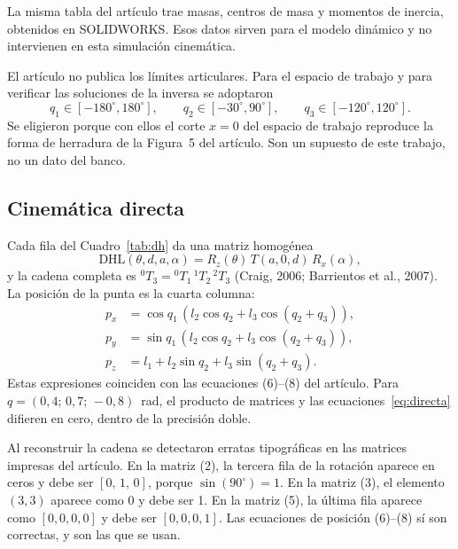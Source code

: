 \documentclass[11pt,a4paper]{article}
\newcommand{\DHL}{\ensuremath{\mathrm{DHL}}}
\begin{document}
La misma tabla del artículo trae masas, centros de masa y momentos de inercia, obtenidos en SOLIDWORKS. Esos datos sirven para el modelo dinámico y no intervienen en esta simulación cinemática.

El artículo no publica los límites articulares. Para el espacio de trabajo y para verificar las soluciones de la inversa se adoptaron
\begin{equation}
q_1\in[-180^\circ,180^\circ],\qquad q_2\in[-30^\circ,90^\circ],\qquad q_3\in[-120^\circ,120^\circ].
\end{equation}
Se eligieron porque con ellos el corte \(x=0\) del espacio de trabajo reproduce la forma de herradura de la Figura~5 del artículo. Son un supuesto de este trabajo, no un dato del banco.

\subsection{Cinemática directa}

Cada fila del Cuadro~\ref{tab:dh} da una matriz homogénea
\begin{equation}
\DHL(\theta,d,a,\alpha)=R_z(\theta)\,T(a,0,d)\,R_x(\alpha),
\end{equation}
y la cadena completa es \({}^{0}T_{3}={}^{0}T_{1}\,{}^{1}T_{2}\,{}^{2}T_{3}\) (Craig, 2006; Barrientos et al., 2007). La posición de la punta es la cuarta columna:
\begin{equation}
\begin{aligned}
p_x &= \cos q_1\,(l_2\cos q_2+l_3\cos(q_2+q_3)),\\
p_y &= \sin q_1\,(l_2\cos q_2+l_3\cos(q_2+q_3)),\\
p_z &= l_1+l_2\sin q_2+l_3\sin(q_2+q_3).
\end{aligned}
\label{eq:directa}
\end{equation}
Estas expresiones coinciden con las ecuaciones (6)--(8) del artículo. Para \(q=(0{,}4;\,0{,}7;\,-0{,}8)\)~rad, el producto de matrices y las ecuaciones~\eqref{eq:directa} difieren en cero, dentro de la precisión doble.

Al reconstruir la cadena se detectaron erratas tipográficas en las matrices impresas del artículo. En la matriz (2), la tercera fila de la rotación aparece en ceros y debe ser \([0,\,1,\,0]\), porque \(\sin(90^\circ)=1\). En la matriz (3), el elemento \((3,3)\) aparece como 0 y debe ser 1. En la matriz (5), la última fila aparece como \([0,0,0,0]\) y debe ser \([0,0,0,1]\). Las ecuaciones de posición (6)--(8) sí son correctas, y son las que se usan.
\end{document}
